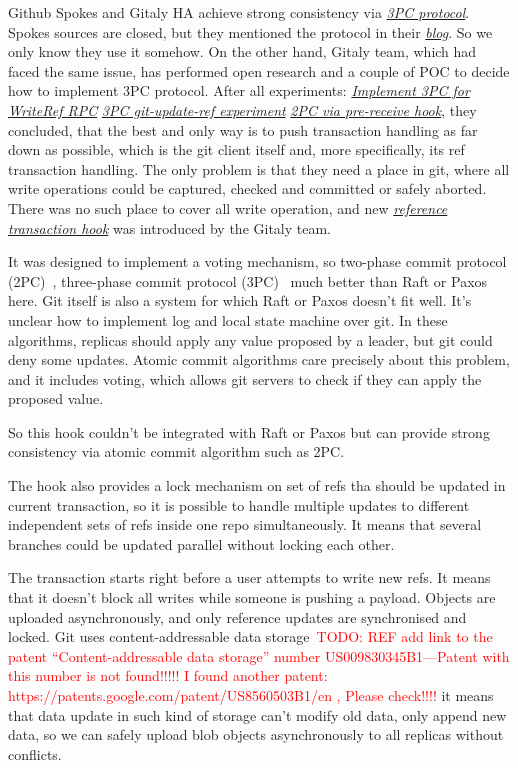 \documentclass[acmlarge, screen, nonacm, 11pt]{acmart}
\newcommand{\todo}[1]{\textcolor{red}{TODO: #1}}
\begin{document}
Github Spokes and Gitaly HA achieve strong consistency via \emph{\href{https://en.wikipedia.org/wiki/Three-phase_commit_protocol}{3PC protocol}}.
Spokes sources are closed, but they mentioned the protocol in their \emph{\href{https://github.blog/2017-10-13-stretching-spokes/\#reducing-round-trips}{blog}}.
So we only know they use it somehow.
On the other hand, Gitaly team, which had faced the same issue, has performed open research and a couple of POC to decide how to implement 3PC protocol.
After all experiments:
\emph{\href{https://gitlab.com/gitlab-org/gitaly/-/issues/2466}{Implement 3PC for WriteRef RPC}}
\emph{\href{https://gitlab.com/gitlab-org/gitaly/-/issues/2529}{3PC git-update-ref experiment}}
\emph{\href{https://gitlab.com/gitlab-org/gitaly/-/issues/2635}{2PC via pre-receive hook}},
  they concluded, that the best and only way is to push transaction handling as far down as possible, which is the git client itself and, more specifically, its ref transaction handling.
The only problem is that they need a place in git, where all write operations could be captured, checked and committed or safely aborted.
There was no such place to cover all write operation, and new
\emph{\href{https://github.com/git/git/commit/675415976704459edaf8fb39a176be2be0f403d8}{reference transaction hook}}
was introduced by the Gitaly team.

It was designed to implement a voting mechanism,
so two-phase commit protocol (2PC)~\cite{two-phase_commit_protocol},
three-phase commit protocol (3PC)~\cite{three-phase_commit_protocol}
much better than Raft or Paxos here.
Git itself is also a system for which Raft or Paxos doesn't fit well.
It's unclear how to implement log and local state machine over git.
In these algorithms, replicas should apply any value proposed by a leader, but git could deny some updates.
Atomic commit algorithms care precisely about this problem, and it includes voting, which allows git servers to check if they can apply the proposed value.

So this hook couldn't be integrated with Raft or Paxos but can provide strong consistency via
atomic commit algorithm such as 2PC\@.

The hook also provides a lock mechanism on set of refs tha should be updated in current transaction,
so it is possible to handle multiple updates to different independent sets of refs inside one repo simultaneously.
It means that several branches could be updated parallel without locking each other.

The transaction starts right before a user attempts to write new refs.
It means that it doesn't block all writes while someone is pushing a payload.
Objects are uploaded asynchronously, and only reference updates are synchronised and
locked. Git uses content-addressable
data storage~\todo{REF add link to the patent ``Content-addressable data storage'' number US009830345B1---Patent with this number is not found!!!!! I found another patent: https://patents.google.com/patent/US8560503B1/en , Please check!!!!}
it means that data update in such kind of storage can't modify old data, only append new data, so we can safely
upload blob objects asynchronously to all replicas without conflicts.
\end{document}
